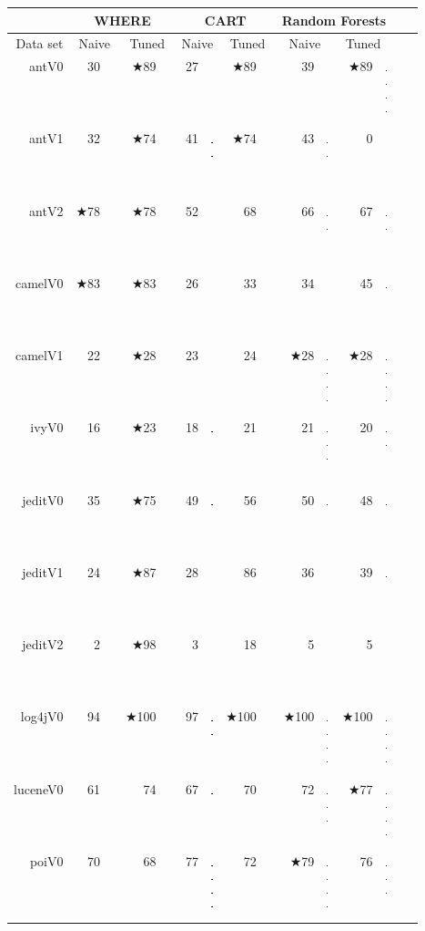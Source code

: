 \documentclass{acm_proc_article-sp}
\newcommand{\crule}[3][darkgray]{\textcolor{#1}{\rule{#2}{#3}}}
\newcommand{\rone}{\crule{1mm}{1.95mm}}
\newcommand{\rtwo}{\crule{1mm}{1.95mm}\hspace{0.3pt}\crule{1mm}{1.95mm}}
\newcommand{\rthree}{\crule{1mm}{1.95mm}\hspace{0.3pt}\crule{1mm}{1.95mm}\hspace{0.3pt}\crule{1mm}{1.95mm}}
\newcommand{\rfour}{\crule{1mm}{1.95mm}\hspace{0.3pt}\crule{1mm}{1.95mm}\hspace{0.3pt}\crule{1mm}{1.95mm}\hspace{0.3pt}\crule{1mm}{1.95mm}}
\begin{document}
\begin{figure}
\renewcommand{\baselinestretch}{0.8} 

\scriptsize  
\begin{tabular}{r|r@{~}l@{~}|r@{~}l|r@{~}l|r@{~}l|r@{~}l@{~}|r@{~}l@{~}r@{~}l}
      &   \multicolumn{4}{c|}{WHERE}         &   \multicolumn{4}{c|}{CART}         &   \multicolumn{4}{c}{Random Forests}         \\\hline
  Data set   &   \multicolumn{2}{c}{Naive}         &   \multicolumn{2}{c|}{Tuned}         &   \multicolumn{2}{c}{Naive}         &   \multicolumn{2}{c|}{Tuned}    &   \multicolumn{2}{c}{Naive}  &   \multicolumn{2}{c}{Tuned}\\\hline
antV0 & 30 &         & $\bigstar$89 & {\rfour} & 27 &         & $\bigstar$89 & {\rfour} & 39 &         & $\bigstar$89 & {\rfour}\\
antV1 & 32 & {\rtwo} & $\bigstar$74 & {\rfour} & 41 & {\rtwo} & $\bigstar$74 & {\rfour} & 43 & {\rtwo} & 0 &        \\
antV2 & $\bigstar$78 & {\rfour} & $\bigstar$78 & {\rfour} & 52 &         & 68 & {\rthree} & 66 & {\rtwo} & 67 & {\rtwo}\\
camelV0 & $\bigstar$83 & {\rfour} & $\bigstar$83 & {\rfour} & 26 &         & 33 &         & 34 &         & 45 & {\rone}\\
camelV1 & 22 &         & $\bigstar$28 & {\rfour} & 23 &         & 24 & {\rone} & $\bigstar$28 & {\rfour} & $\bigstar$28 & {\rfour}\\
ivyV0 & 16 &         & $\bigstar$23 & {\rfour} & 18 & {\rone} & 21 & {\rthree} & 21 & {\rthree} & 20 & {\rtwo}\\
jeditV0 & 35 &         & $\bigstar$75 & {\rfour} & 49 & {\rone} & 56 & {\rtwo} & 50 & {\rone} & 48 & {\rone}\\
jeditV1 & 24 &         & $\bigstar$87 & {\rfour} & 28 &         & 86 & {\rfour} & 36 &         & 39 & {\rone}\\
jeditV2 & 2 &         & $\bigstar$98 & {\rfour} & 3 &         & 18 &         & 5 &         & 5 &        \\
log4jV0 & 94 &         & $\bigstar$100 & {\rfour} & 97 & {\rtwo} & $\bigstar$100 & {\rfour} & $\bigstar$100 & {\rfour} & $\bigstar$100 & {\rfour}\\
luceneV0 & 61 &         & 74 & {\rfour} & 67 & {\rone} & 70 & {\rtwo} & 72 & {\rthree} & $\bigstar$77 & {\rfour}\\
poiV0 & 70 &         & 68 &         & 77 & {\rfour} & 72 & {\rone} & $\bigstar$79 & {\rfour} & 76 & {\rthree}\\

\end{tabular}
\end{figure}
\end{document}

